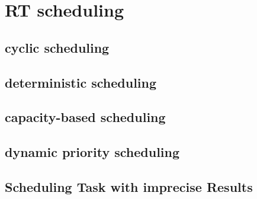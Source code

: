 \chapter{RT scheduling}

\section {cyclic scheduling}
\section{deterministic scheduling}
\section{capacity-based scheduling}
\section{dynamic priority scheduling}
\section{Scheduling Task with imprecise Results}

